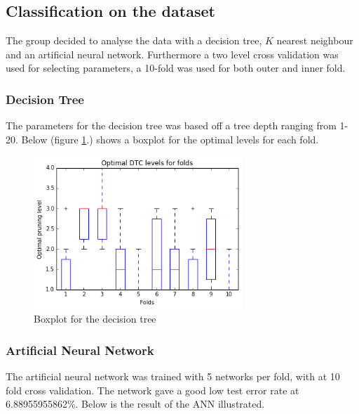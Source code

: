 \subsection{Classification on the dataset}
The group decided to analyse the data with a decision tree, $K$ nearest neighbour and an artificial neural network. Furthermore a two level cross validation was used for selecting parameters, a 10-fold was used for both outer and inner fold. \newline


\subsubsection{Decision Tree}
The parameters for the decision tree was based off a tree depth ranging from 1-20. Below (figure \ref{fig:classification_boxplot}.) shows a boxplot for the optimal levels for each fold. 

\vspace{-5pt}
\begin{figure}[h]
	\centering
	\includegraphics[width=0.7\textwidth]{Fig/classification_decision_tree}
	\vspace{-5pt}
	\caption{Boxplot for the decision tree}
	\label{fig:classification_boxplot}
\end{figure}

\subsubsection{Artificial Neural Network}
The artificial neural network was trained with 5 networks per fold, with at 10 fold cross validation. The network gave a good low test error rate at 6.88955955862\%. Below is the result of the ANN illustrated.


